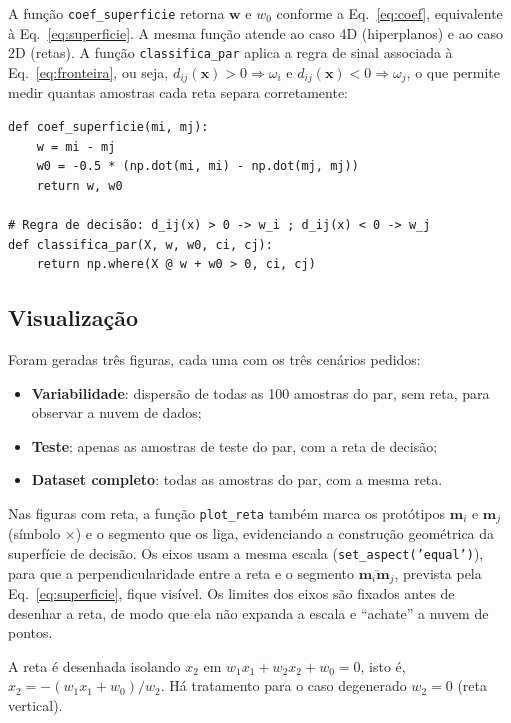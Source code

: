 \documentclass[12pt,a4paper]{article}
\begin{document}
A função \texttt{coef\_superficie} retorna $\mathbf{w}$ e $w_0$ conforme a Eq.~\eqref{eq:coef}, equivalente à Eq.~\eqref{eq:superficie}. A mesma função atende ao caso 4D (hiperplanos) e ao caso 2D (retas). A função \texttt{classifica\_par} aplica a regra de sinal associada à Eq.~\eqref{eq:fronteira}, ou seja, $d_{ij}(\mathbf{x}) > 0 \Rightarrow \omega_i$ e $d_{ij}(\mathbf{x}) < 0 \Rightarrow \omega_j$, o que permite medir quantas amostras cada reta separa corretamente:

\begin{lstlisting}[firstnumber=85]
def coef_superficie(mi, mj):
    w = mi - mj
    w0 = -0.5 * (np.dot(mi, mi) - np.dot(mj, mj))
    return w, w0

# Regra de decisão: d_ij(x) > 0 -> w_i ; d_ij(x) < 0 -> w_j
def classifica_par(X, w, w0, ci, cj):
    return np.where(X @ w + w0 > 0, ci, cj)
\end{lstlisting}

\subsection{Visualização}

Foram geradas três figuras, cada uma com os três cenários pedidos:
\begin{itemize}
  \item \textbf{Variabilidade}: dispersão de todas as 100 amostras do par, sem reta, para observar a nuvem de dados;
  \item \textbf{Teste}: apenas as amostras de teste do par, com a reta de decisão;
  \item \textbf{Dataset completo}: todas as amostras do par, com a mesma reta.
\end{itemize}
Nas figuras com reta, a função \texttt{plot\_reta} também marca os protótipos $\mathbf{m}_i$ e $\mathbf{m}_j$ (símbolo $\times$) e o segmento que os liga, evidenciando a construção geométrica da superfície de decisão. Os eixos usam a mesma escala (\texttt{set\_aspect('equal')}), para que a perpendicularidade entre a reta e o segmento $\overline{\mathbf{m}_i\mathbf{m}_j}$, prevista pela Eq.~\eqref{eq:superficie}, fique visível. Os limites dos eixos são fixados antes de desenhar a reta, de modo que ela não expanda a escala e ``achate'' a nuvem de pontos.

A reta é desenhada isolando $x_2$ em $w_1x_1 + w_2x_2 + w_0 = 0$, isto é, $x_2 = -(w_1x_1 + w_0)/w_2$. Há tratamento para o caso degenerado $w_2 = 0$ (reta vertical).

\end{document}
